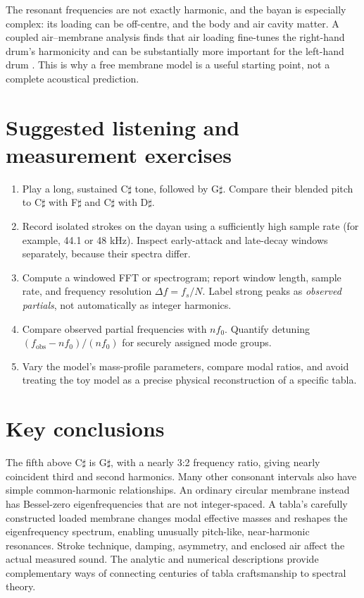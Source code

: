 \documentclass[11pt,letterpaper]{article}
\begin{document}
The resonant frequencies are not exactly harmonic, and the bayan is especially complex: its loading can be off-centre, and the body and air cavity matter. A coupled air--membrane analysis finds that air loading fine-tunes the right-hand drum's harmonicity and can be substantially more important for the left-hand drum \cite{air2017}. This is why a free membrane model is a useful starting point, not a complete acoustical prediction.

\section{Suggested listening and measurement exercises}
\begin{enumerate}[leftmargin=*,itemsep=3pt]
\item Play a long, sustained C\(\sharp\) tone, followed by G\(\sharp\). Compare their blended pitch to C\(\sharp\) with F\(\sharp\) and C\(\sharp\) with D\(\sharp\).
\item Record isolated strokes on the dayan using a sufficiently high sample rate (for example, 44.1 or 48 kHz). Inspect early-attack and late-decay windows separately, because their spectra differ.
\item Compute a windowed FFT or spectrogram; report window length, sample rate, and frequency resolution \(\Delta f=f_s/N\). Label strong peaks as \emph{observed partials}, not automatically as integer harmonics.
\item Compare observed partial frequencies with \(nf_0\). Quantify detuning \((f_{\mathrm{obs}}-nf_0)/(nf_0)\) for securely assigned mode groups.
\item Vary the model's mass-profile parameters, compare modal ratios, and avoid treating the toy model as a precise physical reconstruction of a specific tabla.
\end{enumerate}

\section{Key conclusions}
The fifth above C\(\sharp\) is G\(\sharp\), with a nearly 3:2 frequency ratio, giving nearly coincident third and second harmonics. Many other consonant intervals also have simple common-harmonic relationships. An ordinary circular membrane instead has Bessel-zero eigenfrequencies that are not integer-spaced. A tabla's carefully constructed loaded membrane changes modal effective masses and reshapes the eigenfrequency spectrum, enabling unusually pitch-like, near-harmonic resonances. Stroke technique, damping, asymmetry, and enclosed air affect the actual measured sound. The analytic and numerical descriptions provide complementary ways of connecting centuries of tabla craftsmanship to spectral theory.
\end{document}
